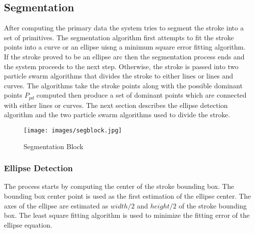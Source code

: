 \documentclass{article}%
\begin{document}
\subsection{Segmentation}
\label{seg}
After computing the primary data the system tries to segment the stroke into a set of primitives. The segmentation algorithm first attempts to fit the stroke points into a curve or an ellipse uisng a minimum square error fitting algorithm. If the stroke proved to be an ellipse arc then the segmentation process ends and the system proceeds to the next step. Otherwise, the stroke is passed into two particle swarm algorithms that divides the stroke to either lines or lines and curves. The algorithms take the stroke points along with the possible dominant points $P_{pd}$ computed then produce a set of dominant points which are connected with either lines or curves. The next section describes the ellipse detection algorithm and the two particle swarm algorithms used to divide the stroke.\\ %
 \begin{figure}
	\centering
		\texttt{[image: images/segblock.jpg]}
	\caption{Segmentation Block}
	\label{fig:segblock}
\end{figure}
\subsubsection{Ellipse Detection} 
The process starts by computing the center of the stroke bounding box. The bounding box center point is used as the first estimation of the ellipse center. The axes of the ellipse are estimated as $width/2$ and $height/2$ of the stroke bounding box. The least square fitting algorithm is used to minimize the fitting error of the ellipse equation. %
\end{document}
